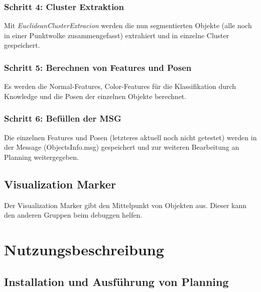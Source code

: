 \documentclass{suturo}
\begin{document}
\subsubsection{Schritt 4: Cluster Extraktion}
Mit \textit{EuclideanClusterExtracion} werden die nun segmentierten Objekte (alle noch in einer Punktwolke zusammengefasst) extrahiert und in einzelne Cluster gespeichert.
\\
\subsubsection{Schritt 5: Berechnen von Features und Posen}
Es werden die Normal-Features, Color-Features für die Klassifikation durch Knowledge und die Posen der einzelnen Objekte berechnet.
 
\subsubsection{Schritt 6: Befüllen der MSG}
Die einzelnen Features und Posen (letzteres aktuell noch nicht getestet) werden in der Message (ObjectsInfo.msg) gespeichert und zur weiteren Bearbeitung an Planning weitergegeben.

\subsection*{Visualization Marker}
Der Visualization Marker gibt den Mittelpunkt von Objekten aus. Dieser kann den anderen Gruppen beim debuggen helfen.

\newpage
\section{Nutzungsbeschreibung}

\subsection{Installation und Ausführung von Planning}
\end{document}
